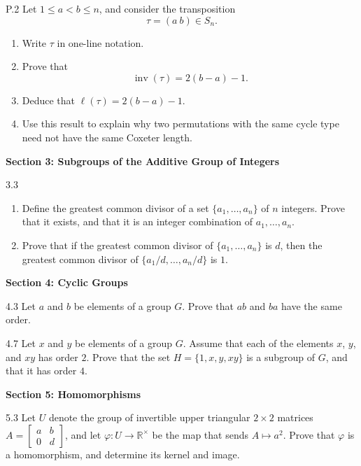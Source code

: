 \documentclass[11pt]{article}
\newcommand{\sectionheading}[1]{%
  \vspace{0.25em}
  {\color{darkgray}\large\bfseries #1}\par
}
\begin{document}
\begin{exercise}{P.2}
Let $1\leq a<b\leq n$, and consider the transposition
\[
\tau=(a\ b)\in S_n.
\]
\begin{enumerate}[label=\textbf{(\alph*)}]
  \item Write $\tau$ in one-line notation.
  \item Prove that
        \[
        \operatorname{inv}(\tau)=2(b-a)-1.
        \]
  \item Deduce that $\ell(\tau)=2(b-a)-1$.
  \item Use this result to explain why two permutations with the same cycle
        type need not have the same Coxeter length.
\end{enumerate}
\end{exercise}

\sectionheading{Section 3: Subgroups of the Additive Group of Integers}

\begin{exercise}{3.3}
\begin{enumerate}[label=\textbf{(\alph*)}]
  \item Define the greatest common divisor of a set
        $\{a_1,\ldots,a_n\}$ of $n$ integers. Prove that it exists, and
        that it is an integer combination of $a_1,\ldots,a_n$.
  \item Prove that if the greatest common divisor of
        $\{a_1,\ldots,a_n\}$ is $d$, then the greatest common divisor of
        $\{a_1/d,\ldots,a_n/d\}$ is $1$.
\end{enumerate}
\end{exercise}

\sectionheading{Section 4: Cyclic Groups}

\begin{exercise}{4.3}
Let $a$ and $b$ be elements of a group $G$. Prove that $ab$ and $ba$ have
the same order.
\end{exercise}

\begin{exercise}{4.7}
Let $x$ and $y$ be elements of a group $G$. Assume that each of the
elements $x$, $y$, and $xy$ has order $2$. Prove that the set
$H=\{1,x,y,xy\}$ is a subgroup of $G$, and that it has order $4$.
\end{exercise}

\sectionheading{Section 5: Homomorphisms}

\begin{exercise}{5.3}
Let $U$ denote the group of invertible upper triangular $2\times2$
matrices $A=\begin{bmatrix}a&b\\0&d\end{bmatrix}$, and let
$\varphi\colon U\to\mathbb{R}^{\times}$ be the map that sends
$A\mapsto a^2$. Prove that $\varphi$ is a homomorphism, and determine its
kernel and image.
\end{exercise}
\end{document}
